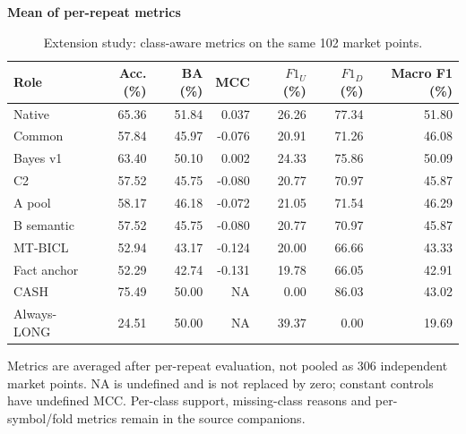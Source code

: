 \begin{table}[p]
\centering\small
\setlength{\tabcolsep}{3pt}
\renewcommand{\arraystretch}{1.12}
\caption{Extension study: class-aware metrics on the same 102 market points.}
\label{tab:u09-classification}
\textbf{Mean of per-repeat metrics}\par\smallskip
\begin{tabular}{lrrrrrr}
\hline
Role & Acc. (\%) & BA (\%) & MCC & $F1_U$ (\%) & $F1_D$ (\%) & Macro F1 (\%) \\
\hline
Native & 65.36 & 51.84 & 0.037 & 26.26 & 77.34 & 51.80 \\
Common & 57.84 & 45.97 & -0.076 & 20.91 & 71.26 & 46.08 \\
Bayes v1 & 63.40 & 50.10 & 0.002 & 24.33 & 75.86 & 50.09 \\
C2 & 57.52 & 45.75 & -0.080 & 20.77 & 70.97 & 45.87 \\
A pool & 58.17 & 46.18 & -0.072 & 21.05 & 71.54 & 46.29 \\
B semantic & 57.52 & 45.75 & -0.080 & 20.77 & 70.97 & 45.87 \\
MT-BICL & 52.94 & 43.17 & -0.124 & 20.00 & 66.66 & 43.33 \\
Fact anchor & 52.29 & 42.74 & -0.131 & 19.78 & 66.05 & 42.91 \\
CASH & 75.49 & 50.00 & NA & 0.00 & 86.03 & 43.02 \\
Always-LONG & 24.51 & 50.00 & NA & 39.37 & 0.00 & 19.69 \\
\hline
\end{tabular}\par\medskip
\begin{minipage}{\textwidth}\footnotesize Metrics are averaged after per-repeat evaluation, not pooled as 306 independent market points. NA is undefined and is not replaced by zero; constant controls have undefined MCC. Per-class support, missing-class reasons and per-symbol/fold metrics remain in the source companions.\end{minipage}
\end{table}
